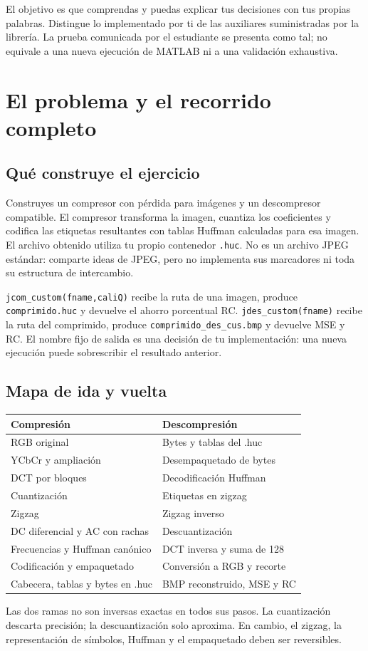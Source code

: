 \documentclass[11pt,a4paper,oneside]{report}
\begin{document}
El objetivo es que comprendas y puedas explicar tus decisiones con tus propias
palabras. Distingue lo implementado por ti de las auxiliares suministradas
por la librería. La prueba comunicada por el estudiante se presenta como tal;
no equivale a una nueva ejecución de MATLAB ni a una validación exhaustiva.
\tableofcontents
\clearpage{}
\chapter{El problema y el recorrido completo}

\section{Qué construye el ejercicio}

Construyes un compresor con pérdida para imágenes y un descompresor compatible.
El compresor transforma la imagen, cuantiza los coeficientes y codifica las
etiquetas resultantes con tablas Huffman calculadas para esa imagen.
El archivo obtenido utiliza tu propio contenedor \texttt{.huc}. No es un
archivo JPEG estándar: comparte ideas de JPEG, pero no implementa sus
marcadores ni toda su estructura de intercambio.

\texttt{jcom\_custom(fname,caliQ)} recibe la ruta de una imagen, produce
\texttt{comprimido.huc} y devuelve el ahorro porcentual RC.
\texttt{jdes\_custom(fname)} recibe la ruta del comprimido, produce
\texttt{comprimido\_des\_cus.bmp} y devuelve MSE y RC.
El nombre fijo de salida es una decisión de tu implementación: una nueva
ejecución puede sobrescribir el resultado anterior.


\section{Mapa de ida y vuelta}

\begin{center}\begin{tabular}{p{}p{}}
\toprule Compresión & Descompresión \\\midrule
RGB original & Bytes y tablas del .huc\\
YCbCr y ampliación & Desempaquetado de bytes\\
DCT por bloques & Decodificación Huffman\\
Cuantización & Etiquetas en zigzag\\
Zigzag & Zigzag inverso\\
DC diferencial y AC con rachas & Descuantización\\
Frecuencias y Huffman canónico & DCT inversa y suma de 128\\
Codificación y empaquetado & Conversión a RGB y recorte\\
Cabecera, tablas y bytes en .huc & BMP reconstruido, MSE y RC\\\bottomrule
\end{tabular}\end{center}
Las dos ramas no son inversas exactas en todos sus pasos. La cuantización
descarta precisión; la descuantización solo aproxima. En cambio, el zigzag,
la representación de símbolos, Huffman y el empaquetado deben ser reversibles.
\end{document}
